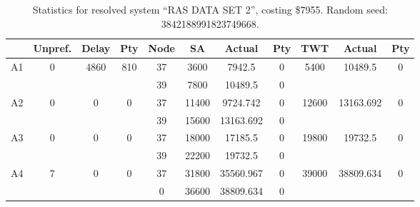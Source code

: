 \begin{sidewaystable}
\footnotesize
\caption{Statistics for resolved system ``RAS DATA SET 2'', costing \$7955. Random seed: 3842188991823749668.}
\centering
\begin{tabular}{c||c|c|c||c|c|c|c||c|c|c}
  \hline \hline
  &
  Unpref. & 
  Delay &
  Pty &
  Node &
  SA &
  Actual &
  Pty &
  TWT &
  Actual &
  Pty \\
      \hline
      \multirow{2}{*}{A1} &
      \multirow{2}{*}{0} &
      \multirow{2}{*}{4860} &
      \multirow{2}{*}{810} &
      37 &
      3600 &
        7942.5 &
        0 &
      \multirow{2}{*}{5400} &
        \multirow{2}{*}{10489.5} &
        \multirow{2}{*}{0}
      \\
      \cline{5-8}
       &
       &
       &
       &
      39 &
      7800 &
        10489.5 &
        0 &
      
         &
        
      \\
      \hline
      \multirow{2}{*}{A2} &
      \multirow{2}{*}{0} &
      \multirow{2}{*}{0} &
      \multirow{2}{*}{0} &
      37 &
      11400 &
        9724.742 &
        0 &
      \multirow{2}{*}{12600} &
        \multirow{2}{*}{13163.692} &
        \multirow{2}{*}{0}
      \\
      \cline{5-8}
       &
       &
       &
       &
      39 &
      15600 &
        13163.692 &
        0 &
      
         &
        
      \\
      \hline
      \multirow{2}{*}{A3} &
      \multirow{2}{*}{0} &
      \multirow{2}{*}{0} &
      \multirow{2}{*}{0} &
      37 &
      18000 &
        17185.5 &
        0 &
      \multirow{2}{*}{19800} &
        \multirow{2}{*}{19732.5} &
        \multirow{2}{*}{0}
      \\
      \cline{5-8}
       &
       &
       &
       &
      39 &
      22200 &
        19732.5 &
        0 &
      
         &
        
      \\
      \hline
      \multirow{2}{*}{A4} &
      \multirow{2}{*}{7} &
      \multirow{2}{*}{0} &
      \multirow{2}{*}{0} &
      37 &
      31800 &
        35560.967 &
        0 &
      \multirow{2}{*}{39000} &
        \multirow{2}{*}{38809.634} &
        \multirow{2}{*}{0}
      \\
      \cline{5-8}
       &
       &
       &
       &
      0 &
      36600 &
        38809.634 &
        0 &
      

\end{tabular}
\end{sidewaystable}
